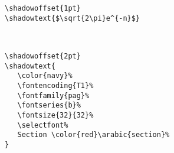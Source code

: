 \documentclass{article}
\begin{document}
\begin{minipage}{\textwidth}
\begin{multicols*}{2} 
{\footnotesize
\begin{verbatim}
\shadowoffset{1pt}
\shadowtext{$\sqrt{2\pi}e^{-n}$}
\end{verbatim}}

\shadowoffset{1pt}
\\
\phantom{}
\end{multicols*}
\end{minipage}

\color{black}

\begin{minipage}{\textwidth}
\begin{multicols*}{2} 
{\footnotesize
\begin{verbatim}
\shadowoffset{2pt}
\shadowtext{
   \color{navy}%
   \fontencoding{T1}%
   \fontfamily{pag}%
   \fontseries{b}%
   \fontsize{32}{32}%
   \selectfont%
   Section \color{red}\arabic{section}%
}
\end{verbatim}}

\shadowoffset{2pt}
\phantom{}\\
\phantom{}\\
\phantom{}\\
\phantom{}\\
\end{multicols*}
\end{minipage}
\end{document}
